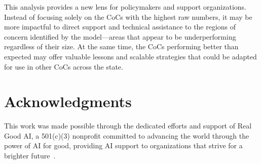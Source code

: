 \documentclass[12pt]{scrartcl}
\begin{document}
This analysis provides a new lens for policymakers and support organizations. Instead of focusing solely on the CoCs with the highest raw numbers, it may be more impactful to direct support and technical assistance to the regions of concern identified by the model---areas that appear to be underperforming regardless of their size. At the same time, the CoCs performing better than expected may offer valuable lessons and scalable strategies that could be adapted for use in other CoCs across the state.

\section{Acknowledgments}

This work was made possible through the dedicated efforts and support of Real Good AI, a 501(c)(3) nonprofit committed to advancing the world through the power of AI for good, providing AI support to organizations that strive for a brighter future~\cite{realgoodai}.



\end{document}
